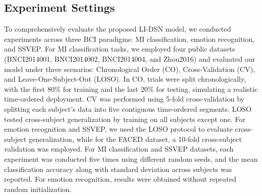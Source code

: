 \documentclass[journal]{IEEEtran}
\theoremstyle{plain}
\begin{document}
\subsection{Experiment Settings}

To comprehensively evaluate the proposed LI-DSN model, we conducted experiments across three BCI paradigms: MI classification, emotion recognition, and SSVEP. For MI classification tasks, we employed four public datasets (BNCI2014001, BNCI2014002, BNCI2014004, and Zhou2016) and evaluated our model under three scenarios: Chronological Order (CO), Cross-Validation (CV), and Leave-One-Subject-Out (LOSO). In CO, trials were split chronologically, with the first 80\% for training and the last 20\% for testing, simulating a realistic time-ordered deployment. CV was performed using 5-fold cross-validation by splitting each subject’s data into five contiguous time-ordered segments. LOSO tested cross-subject generalization by training on all subjects except one. For emotion recognition and SSVEP, we used the LOSO protocol to evaluate cross-subject generalization, while for the FACED dataset, a 10-fold cross-subject validation was employed. For MI classification and SSVEP datasets, each experiment was conducted five times using different random seeds, and the mean classification accuracy along with standard deviation across subjects was reported. For emotion recognition, results were obtained without repeated random initialization.
\end{document}
